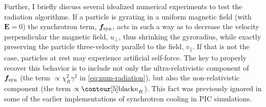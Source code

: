 Further, I briefly discuss several idealized numerical experiments to test the radiation algorithms. If a particle is gyrating in a uniform magnetic field (with $\bm{E}=0$) the synchrotron term, $\bm{f}_{\rm syn}$, acts in such a way as to decrease the velocity perpendicular the magnetic field, $u_\perp$, thus shrinking the gyroradius, while exactly preserving the particle three-velocity parallel to the field, $v_\parallel$. If that is not the case, particles at rest may experience artificial self-force. The key to properly recover this behavior is to include not only the ultra-relativistic component of $\bm{f}_{\rm syn}$ (the term $\propto \chi_R^2\gamma^2$ in \eqref{eq:num-radiation}), but also the non-relativistic component (the term $\propto \Vector{\kappa}_R$). This fact was previously ignored in some of the earlier implementations of synchrotron cooling in PIC simulations. 

\begin{figure}[htb]
\end{figure}

